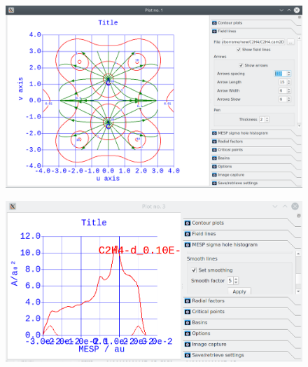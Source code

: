 \documentclass[a4paper,10pt]{article}
\begin{document}
\begin{minipage}{.5\linewidth}
\begin{figure}[H]
\caption{\label{fig:29}}
\begin{center}
\includegraphics[width=0.89\linewidth]{damqt_QS_fig29.png}
\end{center}
\end{figure} 
\end{minipage}
\begin{minipage}{.5\linewidth}
\begin{figure}[H]
\caption{\label{fig:30}}
\begin{center}
\includegraphics[width=1\linewidth]{damqt_QS_fig30.png}
\end{center}
\end{figure} 
\end{minipage}
\end{document}
